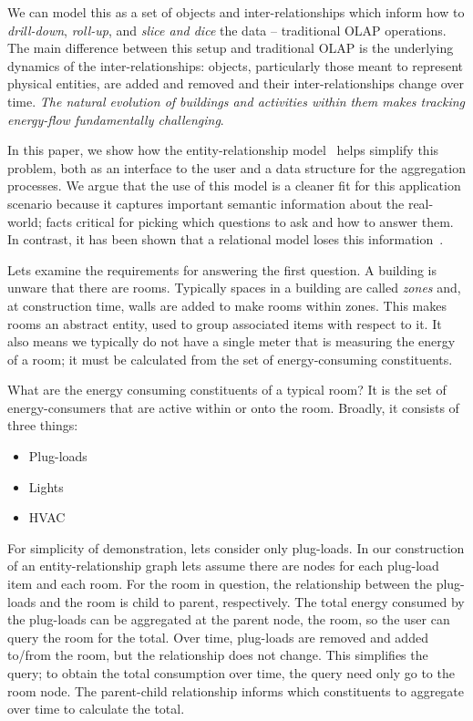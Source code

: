 We can model this as a set of objects and inter-relationships which inform how
to \emph{drill-down}, \emph{roll-up}, and \emph{slice and dice} the data -- traditional OLAP operations.
The main difference between this setup and traditional OLAP is the underlying dynamics of the
inter-relationships: objects, particularly those meant to represent physical entities, are added and removed and 
their inter-relationships change over time.  \emph{The natural evolution of buildings and activities 
within them makes tracking energy-flow fundamentally challenging}.

In this paper, we show how the entity-relationship model~\cite{Chen76theentity-relationship} helps simplify 
this problem, both as an interface
to the user and a data structure for the aggregation processes.  We argue that the use of this model is a cleaner
fit for this application scenario because it captures important semantic information about the real-world;
facts critical for picking which questions to ask and how to answer them.  In contrast, it has been shown 
that a relational model loses this information~\cite{SenkoDB}.


Lets examine the requirements for answering the first question.
A building is unware that there are rooms. Typically spaces in a building are called \emph{zones} and, 
at construction time, walls are added to make rooms within zones.  This makes rooms an abstract
entity, used to group associated items with respect to it.  It also means
we typically do not have a single meter that is measuring the energy of a room; it
must be calculated from the set of energy-consuming constituents.

What are the energy consuming constituents of a typical room?  It is the set of energy-consumers that
are active within or onto the room.  Broadly, it consists of three things:

\begin{itemize}
\item Plug-loads
\item Lights
\item HVAC
\end{itemize}
\vspace{0.08in}

For simplicity of demonstration, lets consider only plug-loads.  In our construction of an entity-relationship
graph lets assume there are nodes for each plug-load item and each room.  For the room in question, the relationship
between the plug-loads and the room is child to parent, respectively.  The total energy consumed by
the plug-loads can be aggregated at the parent node, the room, so the user can query the room for
the total.  Over time, plug-loads are removed and added to/from the room, but the relationship does not
change.  This simplifies the query; to obtain the total consumption over time, the query need only
go to the room node.  The parent-child relationship informs which constituents to aggregate over time
to calculate the total.

